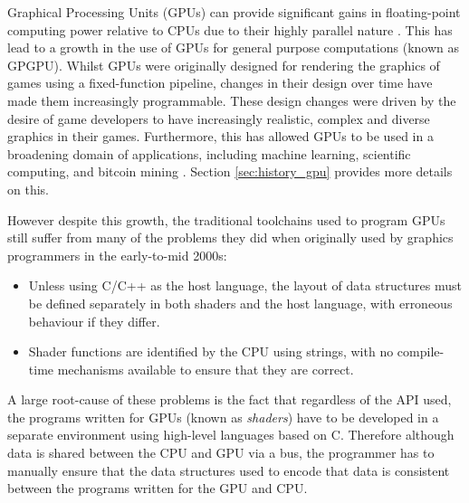 \documentclass[a4paper,12pt,twoside,openright]{report}
\begin{document}

Graphical Processing Units (GPUs) can provide significant gains in
floating-point computing power relative to CPUs due to their highly parallel
nature \cite{CPUGPUOverTime}. This has lead to a growth in the use of GPUs for
general purpose computations (known as GPGPU). Whilst GPUs were originally
designed for rendering the graphics of games using a fixed-function pipeline,
changes in their design over time have made them increasingly programmable.
These design changes were driven by the desire of game developers to have
increasingly realistic, complex and diverse graphics in their games.
Furthermore, this has allowed GPUs to be used in a broadening domain of
applications, including machine learning, scientific computing, and bitcoin
mining \cite{GPUCrypto} \cite{GPUScientificComputing} \cite{GPUAI}. Section
\ref{sec:history_gpu} provides more details on this.

However despite this growth, the traditional toolchains used to program GPUs
still suffer from many of the problems they did when originally used by
graphics programmers in the early-to-mid 2000s:

\begin{itemize}

    \item Unless using C/C++ as the host language, the layout of data
    structures must be defined separately in both shaders and the host
    language, with erroneous behaviour if they differ.

    \item Shader functions are identified by the CPU using strings, with no
    compile-time mechanisms available to ensure that they are correct.


\end{itemize}

A large root-cause of these problems is the fact that regardless of the API
used, the programs written for GPUs (known as \textit{shaders}) have to be
developed in a separate environment using high-level languages based on C.
Therefore although data is shared between the CPU and GPU via a bus, the
programmer has to manually ensure that the data structures used to encode that
data is consistent between the programs written for the GPU and CPU.
\end{document}
